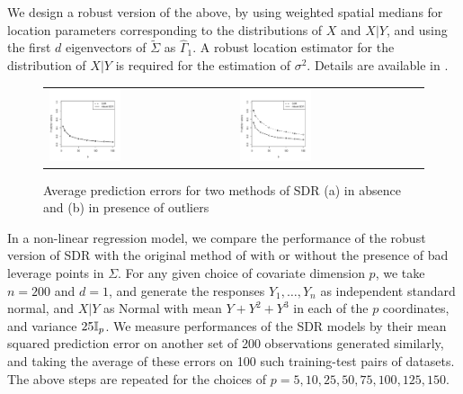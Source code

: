 We design a robust version of the above, by using weighted spatial medians for location 
parameters corresponding to the distributions of $X$ and $X | Y$, and using the first $d$ 
eigenvectors of $\tilde{\Sigma}$ as $\hat\Gamma_{1}$. A robust location estimator for 
the distribution of $X | Y$ is required for the estimation of $\sigma^2$. 
Details are available in \cite{ref:PhilTransRoyalSoc094385_AdragniCook}.
%
\begin{figure}[t!]
\begin{center}
\begin{tabular}{ll}
\includegraphics[width=0.4\textwidth]{./Plots/SDRcomparison_noout} &
\includegraphics[width=0.4\textwidth]{./Plots/SDRcomparison_out}
\end{tabular}
\caption{Average prediction errors for two methods of SDR (a) in absence and (b) in presence of outliers}
\label{fig:SDRfig}
\end{center}
\end{figure}
%
In a non-linear regression model, we compare the performance of the robust version of 
SDR with the original method of 
\cite{ref:PhilTransRoyalSoc094385_AdragniCook} 
with or without the presence of bad leverage points in $\Sigma$. 
For any given choice of covariate dimension $p$, we take $n=200$ and $d=1$, 
and generate the responses 
$Y_1, \ldots, Y_n$ as independent standard normal, and 
$X | Y$ as Normal with mean $Y + Y^{2} + Y^3$ in each of the $p$ coordinates, 
and variance $25 {\mathbb{I}}_p$.
We measure performances of the SDR models by their mean squared prediction error on 
another set of 200 observations  generated similarly, and taking the average of these 
errors on 100 such training-test pairs of datasets. The above steps 
are repeated for the choices of $p = 5, 10, 25, 50, 75, 100, 125, 150$.


